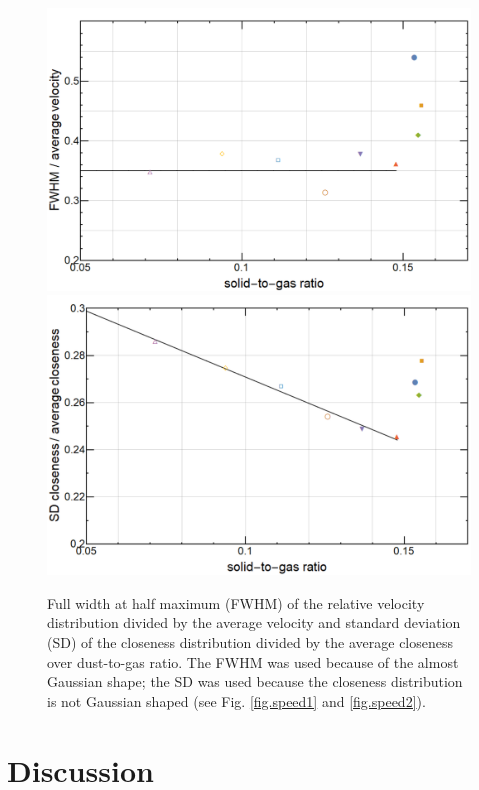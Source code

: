 \begin{figure}[h]
\includegraphics[width=\columnwidth]{fwhm_velocity.pdf}
\includegraphics[width=\columnwidth]{sd_close.pdf}
    \caption{\label{fig.fluctuate} {Full width at half maximum (FWHM) of the }relative velocity {distribution divided by the} average velocity and standard deviation (SD) of the  closeness {distribution divided by the average closeness over dust-to-gas ratio. The FWHM was used because of the almost Gaussian shape; the SD was used because the closeness distribution is not Gaussian shaped (see Fig. \ref{fig.speed1} and \ref{fig.speed2}).}}
\end{figure}


\section{Discussion}


